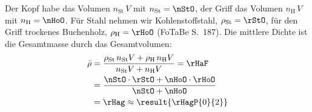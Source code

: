 Der Kopf habe das Volumen $n_\text{St}\,V$ mit $n_\text{St} = \nStO$, der Griff das Volumen $n_\text{H}\,V$ mit $n_\text{H} = \nHoO$. Für Stahl nehmen wir Kohlenstoffstahl, $\rho_\text{St} = \rStO$, für den Griff trockenes Buchenholz, $\rho_\text{H} = \rHoO$ (FoTaBe S.~187). Die mittlere Dichte ist die Gesamtmasse durch das Gesamtvolumen:
\begin{align}
 \bar\rho &= \frac{\rho_\text{St}\,n_\text{St}V+\rho_\text{H}\,n_\text{H}V}{n_\text{St}V+n_\text{H}V} = \rHaF \\
   &= \frac{\nStO\cdot\rStO+\nHoO\cdot\rHoO}{\nStO+\nHoO} \\
   &= \rHag \approx \result{\rHagP{0}{2}}
\end{align}
